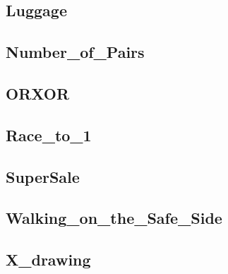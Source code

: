         \subsection{Luggage}
                
        \subsection{Number_of_Pairs}
                
        \subsection{ORXOR}
                
        \subsection{Race_to_1}
                
        \subsection{SuperSale}
                
        \subsection{Walking_on_the_Safe_Side}
                
        \subsection{X_drawing}
                
